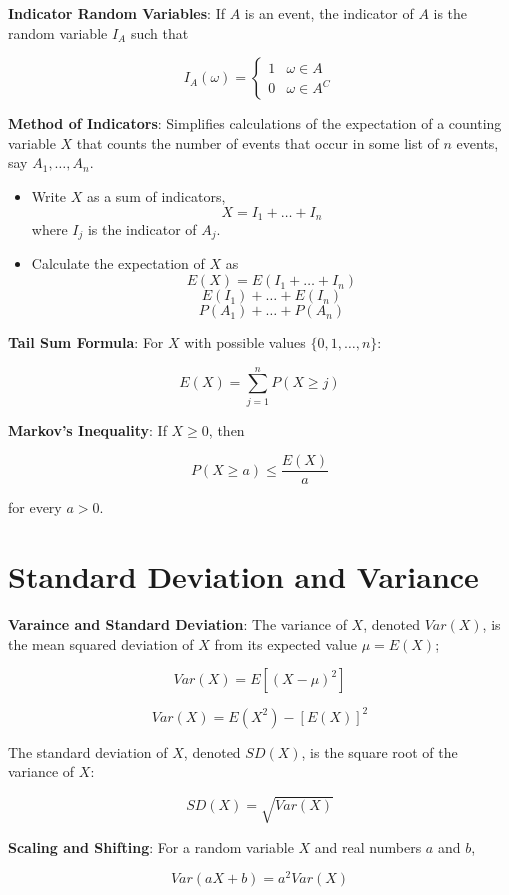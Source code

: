 \documentclass{article}
\begin{document}
\noindent\textbf{\color{blue}Indicator Random Variables}: If $A$ is an event, the indicator of $A$ is the random variable $I_A$ such that 

\[I_A(\omega)=\begin{cases}1&\omega\in A\\0&\omega\in A^C\end{cases}\]

\noindent\textbf{\color{orange}Method of Indicators}: Simplifies calculations of the expectation of a counting variable $X$ that counts the number of events that occur in some list of $n$ events, say $A_1,\ldots,A_n$.

\begin{itemize}
    \item Write $X$ as a sum of indicators,
    \[X=I_1+\ldots+I_n\]
    where $I_j$ is the indicator of $A_j$.
    \item Calculate the expectation of $X$ as
    \[E(X)=E(I_1+\ldots+I_n)\]
    \[E(I_1)+\ldots+E(I_n)\]
    \[P(A_1)+\ldots+P(A_n)\]
\end{itemize}

\noindent\textbf{\color{red}Tail Sum Formula}: For $X$ with possible values $\{0,1,\ldots,n\}$:

\[E(X)=\underset{j=1}{\overset{n}{\sum}}P(X\ge j)\]

\noindent\textbf{\color{red}Markov's Inequality}: If $X\ge0$, then

\[P(X\ge a)\le\frac{E(X)}{a}\]

for every $a>0$.

\section{Standard Deviation and Variance}

\noindent\textbf{\color{blue}Varaince and Standard Deviation}: The variance of $X$, denoted $Var(X)$, is the mean squared deviation of $X$ from its expected value $\mu=E(X)$;

\[Var(X)=E[(X-\mu)^2]\]

\[Var(X)=E(X^2)-[E(X)]^2\]

The standard deviation of $X$, denoted $SD(X)$, is the square root of the variance of $X$:

\[SD(X)=\sqrt{Var(X)}\]

\noindent\textbf{\color{red}Scaling and Shifting}: For a random variable $X$ and real numbers $a$ and $b$,

\[Var(aX+b)=a^2Var(X)\]
 
\end{document}
